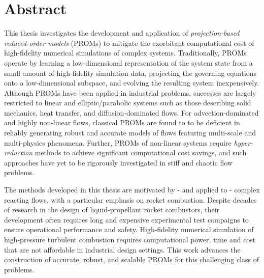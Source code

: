 \chapter{Abstract}


This thesis investigates the development and application of \textit{projection-based reduced-order models} (PROMs) to mitigate the exorbitant computational cost of high-fidelity numerical simulations of complex systems. Traditionally, PROMs operate by learning a low-dimensional representation of the system state from a small amount of high-fidelity simulation data, projecting the governing equations onto a low-dimensional subspace, and evolving the resulting system inexpensively. Although PROMs have been applied in industrial problems, successes are largely restricted to linear and elliptic/parabolic systems such as those describing solid mechanics, heat transfer, and diffusion-dominated flows. For advection-dominated and highly non-linear flows, classical PROMs are found to to be deficient in reliably generating robust and accurate models of flows featuring multi-scale and multi-physics phenomena. Further, PROMs of non-linear systems require \textit{hyper-reduction} methods to achieve significant computational cost savings, and such approaches have yet to be rigorously investigated in stiff and chaotic  flow problems.

The methods developed in this thesis are motivated by - and applied to - complex reacting flows, with a particular emphasis on rocket combustion.
Despite decades of research in the design of liquid-propellant rocket combustors, their development often requires long and expensive experimental test campaigns to ensure operational performance and safety. %
High-fidelity numerical simulation of high-pressure turbulent combustion requires computational power, time and cost that are not affordable in industrial design settings. 
This  work advances the construction of accurate, robust, and scalable PROMs for this challenging class of problems.

